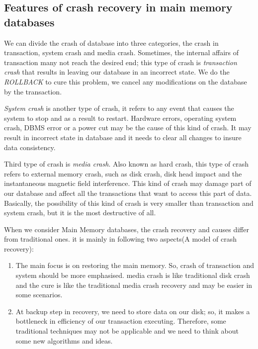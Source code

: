 \documentclass[12pt]{article} %
\begin{document}
\subsection{Features of crash recovery in main memory databases}

We can divide the crash of database into three categories, the crash in transaction, system crash and media crash. Sometimes, the internal affairs of transaction many not reach the desired end; this type of crash is \emph{transaction crash} that results in leaving our database in an incorrect state. We do the \emph{ROLLBACK} to cure this problem, we cancel any modifications on the database by the transaction.

\emph{System crash} is another type of crash, it refers to any event that causes the system to stop and as a result to restart. Hardware errors, operating system crash, DBMS error  or a power cut may be the cause of this kind of crash. It may result in incorrect state in database and it needs to clear all changes to insure data consistency.

Third type of crash is \emph{media crash}. Also known as hard crash, this type of crash refers to external memory crash, such as disk crash, disk head impact and the instantaneous magnetic field interference. This kind of crash may damage part of our database and affect all the transactions that want to access this part of data. Basically, the possibility of this kind of crash is very smaller than transaction and system crash, but it is the most destructive of all.

When we consider Main Memory databases, the crash recovery and causes differ from traditional ones. it is mainly in following two aspects(A model of crash recovery):

\begin{enumerate}

  \item The main focus is on restoring the main memory. So, crash of transaction and system should be more emphasised. media crash is like traditional disk crash and the cure is like the traditional media crash recovery and may be easier in some scenarios.
  \item At backup step in recovery, we need to store data on our disk; so, it makes a bottleneck in efficiency of our transaction executing. Therefore, some traditional techniques may not be applicable and we need to think about some new algorithms and ideas.

\end{enumerate}
\end{document}
